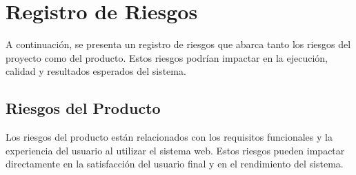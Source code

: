 \documentclass[stu, 12pt, letterpaper, donotrepeattitle, floatsintext, natbib]{apa7}
\begin{document}
\section{\large Registro de Riesgos}

\noindent A continuación, se presenta un registro de riesgos que abarca tanto los riesgos del proyecto como del producto. Estos riesgos podrían impactar en la ejecución, calidad y resultados esperados del sistema. 

\subsection{Riesgos del Producto}
Los riesgos del producto están relacionados con los requisitos funcionales y la experiencia del usuario al utilizar el sistema web. Estos riesgos pueden impactar directamente en la satisfacción del usuario final y en el rendimiento del sistema.
\end{document}
